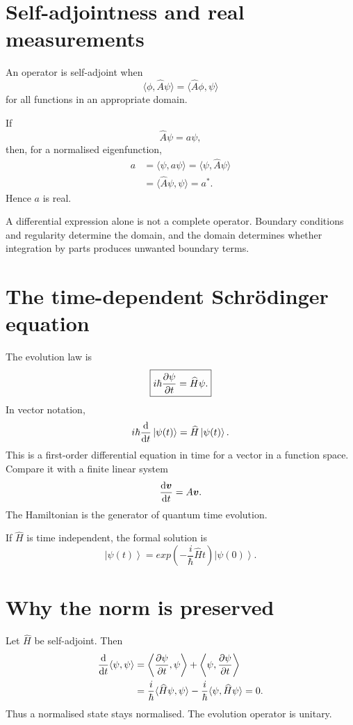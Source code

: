 \documentclass[11pt,a4paper]{article}
\newcommand{\ket}[1]{\left|#1\right\rangle}
\begin{document}
\section{Self-adjointness and real measurements}

An operator is self-adjoint when
\[
\langle\phi,\widehat A\psi\rangle
=\langle\widehat A\phi,\psi\rangle
\]
for all functions in an appropriate domain.

If
\[
\widehat A\psi=a\psi,
\]
then, for a normalised eigenfunction,
\begin{align*}
a&=\langle\psi,a\psi\rangle
=\langle\psi,\widehat A\psi\rangle\\
&=\langle\widehat A\psi,\psi\rangle
=a^*.
\end{align*}
Hence $a$ is real.

\begin{warningbox}
A differential expression alone is not a complete operator. Boundary conditions and regularity determine the domain, and the domain determines whether integration by parts produces unwanted boundary terms.
\end{warningbox}

\section{The time-dependent Schr\"odinger equation}

The evolution law is
\[
\boxed{i\hbar\frac{\partial \psi}{\partial t}=\widehat H\psi.}
\]
In vector notation,
\[
i\hbar\td{}{t}\ket{\psi(t)}=\widehat H\ket{\psi(t)}.
\]
This is a first-order differential equation in time for a vector in a function space. Compare it with a finite linear system
\[
\frac{\mathop{}\!\mathrm d \bm{v}}{\mathop{}\!\mathrm d t}=A\bm{v}.
\]
The Hamiltonian is the generator of quantum time evolution.

If $\widehat H$ is time independent, the formal solution is
\[
\boxed{
\ket{\psi(t)}=exp\left(-\frac{i}{\hbar}\widehat Ht\right)\ket{\psi(0)}.}
\]

\section{Why the norm is preserved}

Let $\widehat H$ be self-adjoint. Then
\begin{align*}
\frac{\mathop{}\!\mathrm d }{\mathop{}\!\mathrm d t}\langle\psi,\psi\rangle
&=\left\langle\frac{\partial \psi}{\partial t},\psi\right\rangle
+\left\langle\psi,\frac{\partial \psi}{\partial t}\right\rangle\\
&=\frac{i}{\hbar}\langle\widehat H\psi,\psi\rangle
-\frac{i}{\hbar}\langle\psi,\widehat H\psi\rangle=0.
\end{align*}
Thus a normalised state stays normalised. The evolution operator is unitary.
\end{document}

